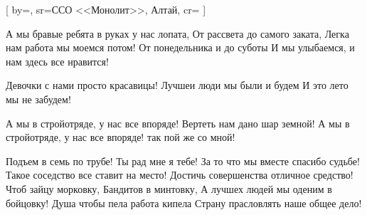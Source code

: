 [
  by={},
  sr={ССО <<Монолит>>, Алтай},
  cr={}
  ]


\ifdefined\EXPLAINED
	
\else 

\fi


\beginverse
А мы бравые ребята в руках у нас лопата,
От рассвета до самого заката,
Легка нам работа мы моемся потом!
От понедельника и до суботы 
И мы улыбаемся, и нам здесь все нравится!

Девочки с нами просто красавицы! 
Лучшеи люди мы были и будем
И это лето мы не забудем!
\endverse


\beginchorus
А мы в стройотряде, у нас все впоряде!
Вертеть нам дано шар земной!
А мы в стройотряде, у нас все впоряде!
так пой же со мной!
\endchorus


\beginverse
Подъем в семь по трубе!
Ты рад мне я тебе!
За то что мы вместе спасибо судьбе!
Такое соседство все ставит на место!
Достичь совершенства отличное средство!
Чтоб зайцу морковку, Бандитов в минтовку,
А лучшех людей мы оденим в бойцовку!
Душа чтобы пела работа кипела 
Страну прасловлять наше общее дело!
\endverse


\endsong
